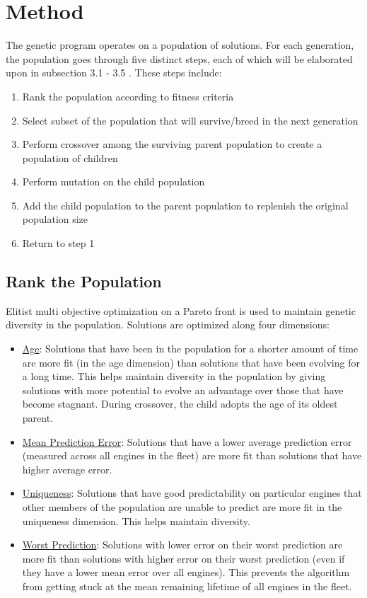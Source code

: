 \documentclass{acm_proc_article-sp}
\begin{document}
\section{Method}
The genetic program operates on a population of solutions. For each generation, the population goes through five distinct steps, each of which will be elaborated upon in subsection 3.1 - 3.5 \cite{class}. These steps include:

\begin{enumerate}
\item Rank the population according to fitness criteria
\item Select subset of the population that will survive/breed in the next generation
\item Perform crossover among the surviving parent population to create a population of children
\item Perform mutation on the child population
\item Add the child population to the parent population to replenish the original population size
\item Return to step 1
\end{enumerate}

\subsection{Rank the Population}
Elitist multi objective optimization on a Pareto front is used to maintain genetic diversity in the population\cite{class}. Solutions are optimized along four dimensions:

\begin{itemize}
\item {\underline{Age}}: Solutions that have been in the population for a shorter amount of time are more fit (in the age dimension) than solutions that have been evolving for a long time. This helps maintain diversity in the population by giving solutions with more potential to evolve an advantage over those that have become stagnant. During crossover, the child adopts the age of its oldest parent. \cite{class}
\item {\underline{Mean Prediction Error}}: Solutions that have a lower average prediction error (measured across all engines in the fleet) are more fit than solutions that have higher average error.
\item {\underline{Uniqueness}}: Solutions that have good predictability on particular engines that other members of the population are unable to predict are more fit in the uniqueness dimension. This helps maintain diversity.
\item {\underline{Worst Prediction}}: Solutions with lower error on their worst prediction are more fit than solutions with higher error on their worst prediction (even if they have a lower mean error over all engines). This prevents the algorithm from getting stuck at the mean remaining lifetime of all engines in the fleet.
\end{itemize}
\end{document}
